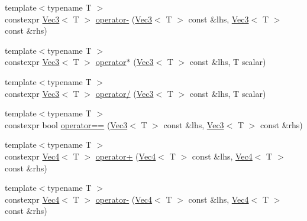 \begin{DoxyCompactItemize}
\item 
{\footnotesize template$<$typename T $>$ }\\constexpr \mbox{\hyperlink{namespace_saturn_1_1_math_af4a7a893730c64ac02b620f648cc5406}{Vec3}}$<$ T $>$ \mbox{\hyperlink{namespace_saturn_1_1_math_a3007ed31596e60e2d533791da5b77ed4}{operator-\/}} (\mbox{\hyperlink{namespace_saturn_1_1_math_af4a7a893730c64ac02b620f648cc5406}{Vec3}}$<$ T $>$ const \&lhs, \mbox{\hyperlink{namespace_saturn_1_1_math_af4a7a893730c64ac02b620f648cc5406}{Vec3}}$<$ T $>$ const \&rhs)
\item 
{\footnotesize template$<$typename T $>$ }\\constexpr \mbox{\hyperlink{namespace_saturn_1_1_math_af4a7a893730c64ac02b620f648cc5406}{Vec3}}$<$ T $>$ \mbox{\hyperlink{namespace_saturn_1_1_math_a23956694345c4db5ec1150a7ff108440}{operator$\ast$}} (\mbox{\hyperlink{namespace_saturn_1_1_math_af4a7a893730c64ac02b620f648cc5406}{Vec3}}$<$ T $>$ const \&lhs, T scalar)
\item 
{\footnotesize template$<$typename T $>$ }\\constexpr \mbox{\hyperlink{namespace_saturn_1_1_math_af4a7a893730c64ac02b620f648cc5406}{Vec3}}$<$ T $>$ \mbox{\hyperlink{namespace_saturn_1_1_math_a367f6c2acfeddaefbe7a5b9ac3492b58}{operator/}} (\mbox{\hyperlink{namespace_saturn_1_1_math_af4a7a893730c64ac02b620f648cc5406}{Vec3}}$<$ T $>$ const \&lhs, T scalar)
\item 
{\footnotesize template$<$typename T $>$ }\\constexpr bool \mbox{\hyperlink{namespace_saturn_1_1_math_a22c98ba4f428e138bd2d902f58556748}{operator==}} (\mbox{\hyperlink{namespace_saturn_1_1_math_af4a7a893730c64ac02b620f648cc5406}{Vec3}}$<$ T $>$ const \&lhs, \mbox{\hyperlink{namespace_saturn_1_1_math_af4a7a893730c64ac02b620f648cc5406}{Vec3}}$<$ T $>$ const \&rhs)
\item 
{\footnotesize template$<$typename T $>$ }\\constexpr \mbox{\hyperlink{namespace_saturn_1_1_math_a311b3d690ef397050af7963caa08d1bd}{Vec4}}$<$ T $>$ \mbox{\hyperlink{namespace_saturn_1_1_math_afbaf057a9ff3c0e9c4f6a5397e157c88}{operator+}} (\mbox{\hyperlink{namespace_saturn_1_1_math_a311b3d690ef397050af7963caa08d1bd}{Vec4}}$<$ T $>$ const \&lhs, \mbox{\hyperlink{namespace_saturn_1_1_math_a311b3d690ef397050af7963caa08d1bd}{Vec4}}$<$ T $>$ const \&rhs)
\item 
{\footnotesize template$<$typename T $>$ }\\constexpr \mbox{\hyperlink{namespace_saturn_1_1_math_a311b3d690ef397050af7963caa08d1bd}{Vec4}}$<$ T $>$ \mbox{\hyperlink{namespace_saturn_1_1_math_a41df371fb0ff831703c54b6f0927c003}{operator-\/}} (\mbox{\hyperlink{namespace_saturn_1_1_math_a311b3d690ef397050af7963caa08d1bd}{Vec4}}$<$ T $>$ const \&lhs, \mbox{\hyperlink{namespace_saturn_1_1_math_a311b3d690ef397050af7963caa08d1bd}{Vec4}}$<$ T $>$ const \&rhs)

\end{DoxyCompactItemize}
